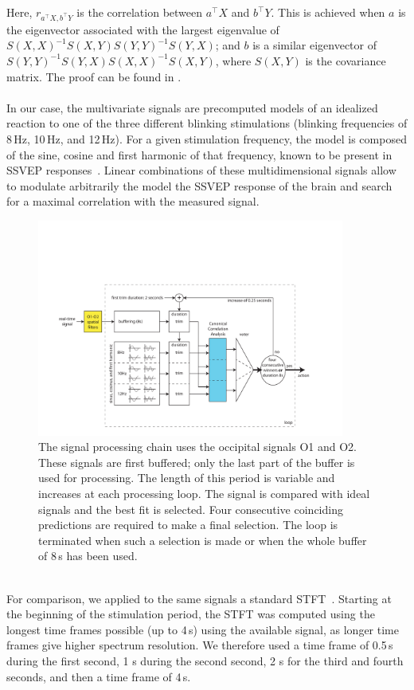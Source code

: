 \documentclass[smallextended]{svjour3}
\begin{document}
Here, $r_{a^\top X, b^\top Y}$ is the correlation between $a^\top X$ and $b^\top Y$. This is achieved when $a$ is the eigenvector associated with the largest eigenvalue of $S(X, X)^{-1} S(X,Y) S(Y, Y)^{-1} S(Y, X)$; and $b$ is a similar eigenvector of $S(Y, Y)^{-1} S(Y, X) S(X, X)^{-1} S(X, Y)$, where $S(X, Y)$ is the covariance matrix. The proof can be found in \cite{rencher2003}.\\
\\
In our case, the multivariate signals are precomputed models of an idealized reaction to one of the three different blinking stimulations (blinking frequencies of 8\,Hz, 10\,Hz, and 12\,Hz).
For a given stimulation frequency, the model is composed of the sine, cosine and first harmonic of that frequency, known to be present in SSVEP responses~\cite{herrmann2001}.
Linear combinations of these multidimensional signals allow to modulate arbitrarily the model the SSVEP response of the brain and search for a maximal correlation with the measured signal.\\
\begin{figure}
\center
\includegraphics[width=0.9\textwidth]{figures/schema-openvibe-cca.pdf}
\caption{The signal processing chain uses the occipital signals O1 and O2. These signals are first buffered; only the last part of the buffer is used for processing. The length of this period is variable and increases at each processing loop. The signal is compared with ideal signals and the best fit is selected. Four consecutive coinciding predictions are required to make a final selection. The loop is terminated when such a selection is made or when the whole buffer of 8\,s has been used.}
\label{fig:schema-openvibe-cca}
\end{figure}
\\
For comparison, we applied to the same signals a standard STFT~\cite{Durak2003}. 
Starting at the beginning of the stimulation period, the STFT was computed using the longest time frames possible (up to 4\,s) using the available signal, as longer time frames give higher spectrum resolution. %
We therefore used a time frame of 0.5\,s during the first second, 1 s during the second second, 2 s for the third and fourth seconds, and then a time frame of 4\,s.
\end{document}
